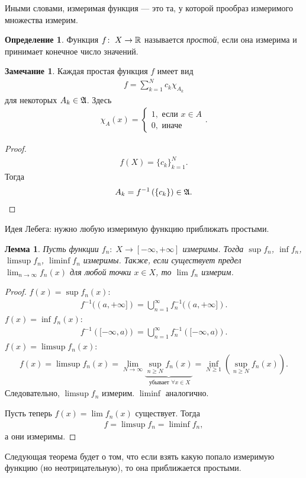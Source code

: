 \documentclass[a4paper,14pt]{extarticle}
\newcounter{theoremCnt}
\theoremstyle{definition}
\newtheorem{df}[theoremCnt]{Определение}
\theoremstyle{plain}
\theoremstyle{plain}
\newtheorem{lm}[theoremCnt]{Лемма}
\theoremstyle{plain}
\theoremstyle{plain}
\theoremstyle{definition}
\theoremstyle{definition}
\newtheorem{remrk}[theoremCnt]{Замечание}
\theoremstyle{definition}
\theoremstyle{definition}
\theoremstyle{definition}
\theoremstyle{definition}
\theoremstyle{plain}
\theoremstyle{plain}
\theoremstyle{plain}
\theoremstyle{plain}
\theoremstyle{definition}
\theoremstyle{definition}
\theoremstyle{definition}
\theoremstyle{definition}
\theoremstyle{definition}
\newcommand{\R}{\ensuremath \mathbb{R}}
\newcommand{\A}{\ensuremath \mathfrak{A}}
\begin{document}
Иными словами, измеримая функция --- это та, у которой прообраз измеримого множества измерим.
\begin{df}
 Функция $f \colon\; X \to \R$ называется \textit{простой}, если она измерима и принимает конечное число значений.
\end{df}
\begin{remrk}
 Каждая простая функция $f$ имеет вид
 \begin{align*}
  f = \sum_{k=1}^{N} c_k \chi_{A_k}
 \end{align*} для некоторых $A_k \in \A$. Здесь
 \begin{align*}
  \chi_A(x) = \begin{cases}
               1, \text{ если } x \in A \\
               0, \text{ иначе }
              \end{cases}
  .\end{align*}
\end{remrk}
\begin{proof}
 \begin{align*}
  f(X) = \{c_{k}\}_{k=1}^{N}
  .\end{align*} Тогда
 \begin{align*}
  A_k = f^{-1} \left( \left\{ c_k \right\} \right) \in \A
  .\end{align*}
\end{proof}
Идея Лебега: нужно любую измеримую функцию приближать простыми.
\begin{lm}
 Пусть функции $f_n \colon\; X \to [-\infty, +\infty]$ измеримы. Тогда $\sup f_n$, $\inf f_n$,  $\limsup f_n$, $\liminf f_n$ измеримы. Также, если существует предел  $\lim_{n \to \infty} f_n(x)$ для любой точки $x \in X$, то $\lim f_n$ измерим.
\end{lm}
\begin{proof}
 $f(x) = \sup f_n(x)$:
 \begin{align*}
  f^{-1}((a, +\infty]) = \bigcup_{n=1}^{\infty} f^{-1}_n( (a, +\infty] )
  .\end{align*} $f(x) = \inf f_n(x)$:
 \begin{align*}
  f^{-1} \left( [-\infty, a) \right) = \bigcup_{n=1}^{\infty} f^{-1}_n \left( [-\infty, a) \right)
  .\end{align*}  $f(x) = \limsup f_n(x)$:
 \begin{align*}
  f(x) = \limsup f_n(x) = \displaystyle\lim_{N \to \infty} \underbrace{\sup_{n \geqslant N} f_n(x)}_{\text{ убывает } \forall x \in X} = \inf_{N \geqslant 1} \left( \sup_{n \geqslant N} f_n(x) \right)
  .\end{align*} Следовательно, $\limsup f_n$ измерим. $\liminf$ аналогично.

 Пусть теперь $f(x) = \lim f_n(x)$ существует. Тогда
 \begin{align*}
  f = \limsup f_n = \liminf f_n
  ,\end{align*} а они измеримы.
\end{proof}

Следующая теорема будет о том, что если взять какую попало измеримую функцию (но неотрицательную), то она приближается простыми.
\end{document}
